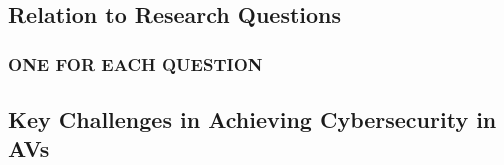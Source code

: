 \subsection{Relation to Research Questions}\label{subsec:relation-to-research-questions}
\subsubsection{ONE FOR EACH QUESTION}
\subsection{Key Challenges in Achieving Cybersecurity in AVs}\label{subsec:key-challenges-in-achieving-cybersecurity-in-avs}

